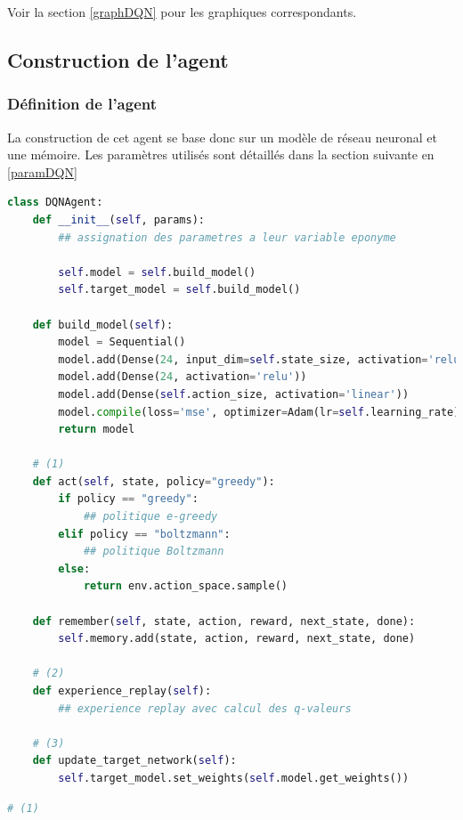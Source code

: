 \documentclass[10pt,a4paper]{article}
\begin{document}
Voir la section \ref{graphDQN} pour les graphiques correspondants.

\subsection{Construction de l'agent}

\subsubsection{Définition de l'agent} \label{modeleneuronal}

La construction de cet agent se base donc sur un modèle de réseau neuronal et une mémoire. Les paramètres utilisés sont détaillés dans la section suivante en \ref{paramDQN}

\begin{lstlisting}[language=Python, caption=Programme principal de l'agent utilisant l'expérience replay]
class DQNAgent:
    def __init__(self, params):
        ## assignation des parametres a leur variable eponyme

        self.model = self.build_model()
        self.target_model = self.build_model()

    def build_model(self):
        model = Sequential()
        model.add(Dense(24, input_dim=self.state_size, activation='relu'))
        model.add(Dense(24, activation='relu'))
        model.add(Dense(self.action_size, activation='linear'))
        model.compile(loss='mse', optimizer=Adam(lr=self.learning_rate))
        return model

	# (1)
    def act(self, state, policy="greedy"):
        if policy == "greedy":
            ## politique e-greedy
        elif policy == "boltzmann":
            ## politique Boltzmann
        else:
            return env.action_space.sample()

    def remember(self, state, action, reward, next_state, done):
        self.memory.add(state, action, reward, next_state, done)

	# (2)
    def experience_replay(self):
        ## experience replay avec calcul des q-valeurs
    
    # (3)
    def update_target_network(self):
        self.target_model.set_weights(self.model.get_weights())
\end{lstlisting}

\begin{lstlisting}[language=Python]
# (1)
\end{lstlisting}
\end{document}
